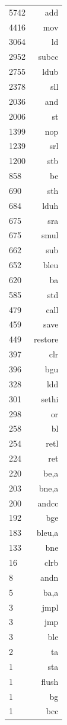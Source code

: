 \documentclass[a4paper]{scrartcl}
\begin{document}
\begin{table}[h]
	\tiny
	\begin{center}
	\begin{tabular}{|l | r|}
		\hline
		   5742 & add \\
		4416 & mov \\
		3064 & ld \\
		2952 & subcc \\
		2755 & ldub \\
		2378 & sll \\
		2036 & and \\
		2006 & st \\
		1399 & nop \\
		1239 & srl \\
		1200 & stb \\
		858 & be \\
		690 & sth \\
		684 & lduh \\
		675 & sra \\
		675 & smul \\
		662 & sub \\
		652 & bleu \\
		620 & ba \\
		585 & std \\
		479 & call \\
		459 & save \\
		449 & restore \\
		397 & clr \\
		396 & bgu \\
		328 & ldd \\
		301 & sethi \\
		298 & or \\
		258 & bl \\
		254 & retl \\
		224 & ret \\
		220 & be,a \\
		203 & bne,a \\
		200 & andcc \\
		192 & bge \\
		183 & bleu,a \\
		133 & bne \\
		16 & clrb \\
		8 & andn \\
		5 & ba,a \\
		3 & jmpl \\
		3 & jmp \\
		3 & ble \\
		2 & ta \\
		1 & sta \\
		1 & flush \\
		1 & bg \\
		1 & bcc \\
		\hline
	\end{tabular}
	\end{center}
\end{table}
\end{document}
